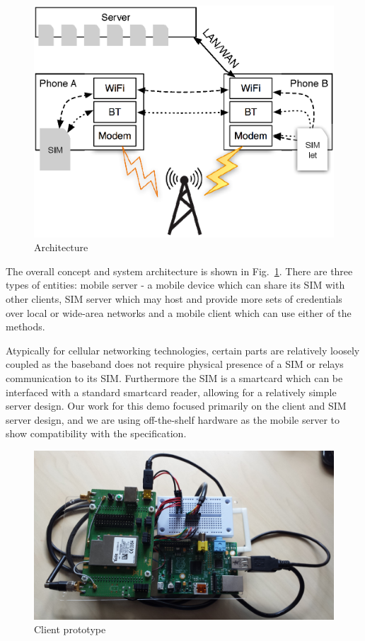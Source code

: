 \documentclass{sig-alternate-10pt}
\begin{document}
\begin{figure}
\centering
\includegraphics[width=0.95\columnwidth]{figs/arch}
\caption{Architecture}
\label{fig:arch}
\end{figure}

The overall concept and system architecture is shown in Fig.~\ref{fig:arch}. There are three types of entities: mobile server - a mobile device which can share its SIM with other clients, SIM server which may host and provide more sets of credentials over local or wide-area networks and a mobile client which can use either of the methods.

Atypically for cellular networking technologies, certain parts are relatively loosely coupled as the baseband does not require physical presence of a SIM  or relays communication to its SIM. Furthermore the SIM is a smartcard which can be interfaced with a standard smartcard reader, allowing for a relatively simple server design. Our work for this demo focused primarily on the client and SIM server design, and we are using off-the-shelf hardware as the mobile server to show compatibility with the specification.

\begin{figure}[t!]
\centering
\includegraphics[width=0.95\columnwidth]{figs/client}
\caption{Client prototype}
\label{fig:client}
\end{figure}
\end{document}
